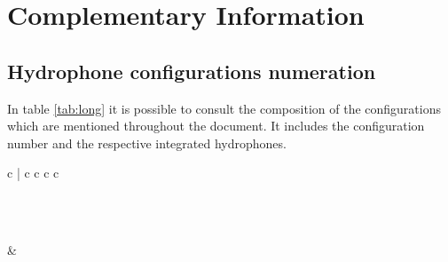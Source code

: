 \chapter{Complementary Information} \label{ap1:Lorem}


\section{Hydrophone configurations numeration}

In table \ref{tab:long} it is possible to consult the composition of the configurations which are mentioned throughout the document. It includes the configuration number and the respective integrated hydrophones.

\begin{longtable}{c | c c c c}
	\caption{Configurations for the Monte Carlo approach with 9 employed hydrophones} \label{tab:long} \\
	
	\endfirsthead
	
	{{\bfseries \tablename\ \thetable{} }} \\
	\midrule{} &  \\ \hline 
	\endhead
	
	\endfoot
	 
	\endlastfoot


\end{longtable}
